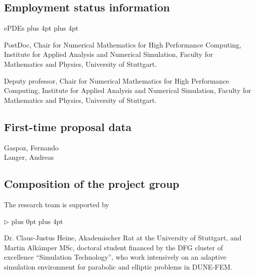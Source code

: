 \documentclass[enabledeprecatedfontcommands,cleardoublepage=empty,headsepline,twoside,11pt,DIV=15,BCOR=12mm,final]{scrartcl}
\renewenvironment{description}
{\begin{list}{\epdes}{\topsep0mm \labelwidth0mm \leftmargin3mm %
  \itemsep1pt plus 4pt \topsep3pt \parsep1pt plus 4pt \labelsep3mm}}
{\end{list}}
\renewenvironment{itemize}
{\begin{list}{$\triangleright$}{\labelwidth-2mm \leftmargin3mm %
  \itemsep5pt plus 0pt  \topsep3pt \parsep1pt plus 4pt \labelsep2mm}}
{\end{list}}
\newcommand{\dunefem}{\textsf{DUNE-FEM}\xspace}
\newcommand{\epdes}{\textsf{ePDEs}\xspace}
\begin{document}
\subsection{Employment status information}
\label{sec:empl-stat-inform}
\begin{description}
\item[Fernando D. Gaspoz:] PostDoc, Chair for Numerical Mathematics for
  High Performance Computing, Institute for Applied Analysis and Numerical
  Simulation, Faculty for Mathematics and Physics, University of Stuttgart.
\item[Andreas Langer:] Deputy professor, Chair for Numerical Mathematics for High Performance Computing, Institute for Applied Analysis and Numerical   Simulation, Faculty for Mathematics and Physics, University of Stuttgart.
\end{description}

\subsection{First-time proposal data}
Gaspoz, Fernando\\
Langer, Andreas

\subsection{Composition of the project group}
\label{sec:comp-proj-group}


The research team is supported by
\begin{itemize}
\item Dr. Claus-Justus Heine, Akademischer Rat at the University of Stuttgart,
  and Martin Alk\"amper MSc, doctoral student financed by the DFG cluster of excellence
  ``Simulation Technology'', who work intensively on an
  adaptive simulation environment for parabolic and elliptic problems in \dunefem.
\end{itemize}
\end{document}
